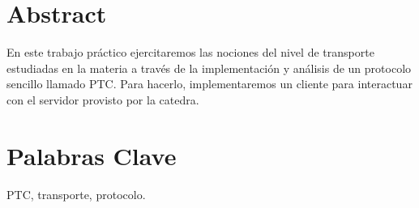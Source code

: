 \documentclass[a4paper,spanish,12pt]{article}
\begin{document}

  


    \maketitle
    
    

	\tableofcontents
	\newpage

\section{Abstract}
\indent En este trabajo práctico ejercitaremos las nociones del nivel de transporte estudiadas en la materia a través de la implementación y análisis de un protocolo sencillo llamado PTC. Para hacerlo, implementaremos un cliente para interactuar con el servidor provisto por la catedra.\\


\section{Palabras Clave}
PTC, transporte, protocolo.






\newpage














 
\end{document}

